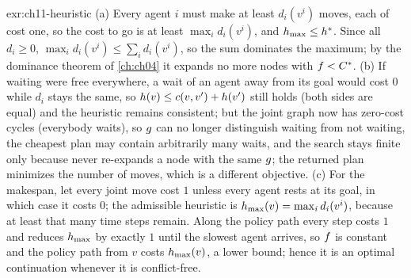 \begin{solution}{exr:ch11-heuristic}
(a) Every agent $i$ must make at least $d_i(v^i)$ moves, each of cost one, so the cost to go is at least $\max_i d_i(v^i)$, and $h_{\max} \le h^*$. Since all $d_i \ge 0$, $\max_i d_i(v^i) \le \sum_i d_i(v^i)$, so the sum dominates the maximum; by the dominance theorem of \cref{ch:ch04} it expands no more nodes with $f < C^*$. (b) If waiting were free everywhere, a wait of an agent away from its goal would cost $0$ while $d_i$ stays the same, so $h(v) \le c(v, v') + h(v')$ still holds (both sides are equal) and the heuristic remains consistent; but the joint graph now has zero-cost cycles (everybody waits), so $g$ can no longer distinguish waiting from not waiting, the cheapest plan may contain arbitrarily many waits, and the search stays finite only because \astar never re-expands a node with the same $g$; the returned plan minimizes the number of moves, which is a different objective. (c) For the makespan, let every joint move cost $1$ unless every agent rests at its goal, in which case it costs $0$; the admissible heuristic is $h_{\max}(v) = \max_i d_i(v^i)$, because at least that many time steps remain. Along the policy path every step costs $1$ and reduces $h_{\max}$ by exactly $1$ until the slowest agent arrives, so $f$ is constant and the policy path from $v$ costs $h_{\max}(v)$, a lower bound; hence it is an optimal continuation whenever it is conflict-free.
\end{solution}

